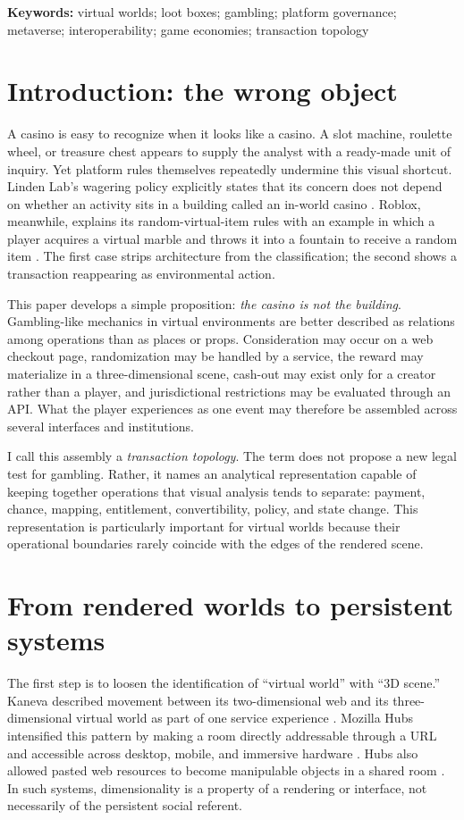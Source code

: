 \documentclass[11pt]{article}
\begin{document}
\textbf{Keywords:} virtual worlds; loot boxes; gambling; platform governance; metaverse; interoperability; game economies; transaction topology

\section{Introduction: the wrong object}
A casino is easy to recognize when it looks like a casino. A slot machine, roulette wheel, or treasure chest appears to supply the analyst with a ready-made unit of inquiry. Yet platform rules themselves repeatedly undermine this visual shortcut. Linden Lab's wagering policy explicitly states that its concern does not depend on whether an activity sits in a building called an in-world casino \parencite{linden_wagering_policy}. Roblox, meanwhile, explains its random-virtual-item rules with an example in which a player acquires a virtual marble and throws it into a fountain to receive a random item \parencite{roblox_marble_fountain_2026}. The first case strips architecture from the classification; the second shows a transaction reappearing as environmental action.

This paper develops a simple proposition: \emph{the casino is not the building}. Gambling-like mechanics in virtual environments are better described as relations among operations than as places or props. Consideration may occur on a web checkout page, randomization may be handled by a service, the reward may materialize in a three-dimensional scene, cash-out may exist only for a creator rather than a player, and jurisdictional restrictions may be evaluated through an API. What the player experiences as one event may therefore be assembled across several interfaces and institutions.

I call this assembly a \emph{transaction topology}. The term does not propose a new legal test for gambling. Rather, it names an analytical representation capable of keeping together operations that visual analysis tends to separate: payment, chance, mapping, entitlement, convertibility, policy, and state change. This representation is particularly important for virtual worlds because their operational boundaries rarely coincide with the edges of the rendered scene.

\section{From rendered worlds to persistent systems}
The first step is to loosen the identification of ``virtual world'' with ``3D scene.'' Kaneva described movement between its two-dimensional web and its three-dimensional virtual world as part of one service experience \parencite{norris2009virtualhealth}. Mozilla Hubs intensified this pattern by making a room directly addressable through a URL and accessible across desktop, mobile, and immersive hardware \parencite{white2018hubs}. Hubs also allowed pasted web resources to become manipulable objects in a shared room \parencite{marinacci2018hubsmedia}. In such systems, dimensionality is a property of a rendering or interface, not necessarily of the persistent social referent.
\end{document}
